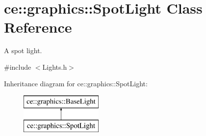 \hypertarget{classce_1_1graphics_1_1_spot_light}{}\section{ce\+:\+:graphics\+:\+:Spot\+Light Class Reference}
\label{classce_1_1graphics_1_1_spot_light}


A spot light.  




{\ttfamily \#include $<$Lights.\+h$>$}

Inheritance diagram for ce\+:\+:graphics\+:\+:Spot\+Light\+:\begin{figure}[H]
\begin{center}
\leavevmode
\includegraphics[height=2.000000cm]{classce_1_1graphics_1_1_spot_light}
\end{center}
\end{figure}
